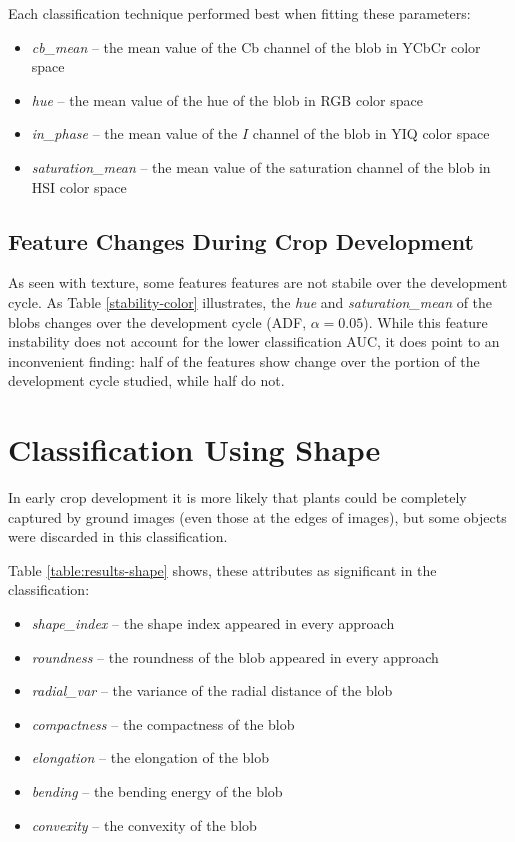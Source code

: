 \documentclass[letterpaper, notitlepage]{report}
\begin{document}
Each classification technique performed best when fitting these parameters:
\begin{itemize}
	\item{\textit{cb\_mean} -- the mean value of the Cb channel of the blob in YCbCr color space}
	\item{\textit{hue} -- the mean value of the hue of the blob in RGB color space}
	\item{\textit{in\_phase} -- the mean value of the $I$ channel of the blob in YIQ color space}
	\item{\textit{saturation\_mean} -- the mean value of the saturation channel of the blob in HSI color space}
\end{itemize}

\subsection{Feature Changes During Crop Development}
As seen with texture, some features features are not stabile  over the development cycle. As Table \ref{stability-color} illustrates, the \textit{hue} and \textit{saturation\_mean} of the blobs changes over the development cycle (ADF, $\alpha = 0.05$). While this feature instability does not account for the lower classification AUC, it does point to an inconvenient finding: half of the features show change over the portion of the development cycle studied, while half do not.

{
\renewcommand{\arraystretch}{1.2}

}


\section{Classification Using Shape}
In early crop development it is more likely that plants could be completely captured by ground images (even those at the edges of images), but some objects were discarded in this classification.

 Table \ref{table:results-shape} shows, these attributes as significant in the classification:
\begin{itemize}
	\item{\textit{shape\_index} -- the shape index appeared in every approach}
	\item{\textit{roundness} -- the roundness of the blob appeared in every approach}
	\item{\textit{radial\_var} -- the variance of the radial distance of the blob}
	\item{\textit{compactness} -- the compactness of the blob}
	\item{\textit{elongation} -- the elongation of the blob}
	\item{\textit{bending} -- the bending energy of the blob}
	\item{\textit{convexity} -- the convexity of the blob}
\end{itemize}
\end{document}
